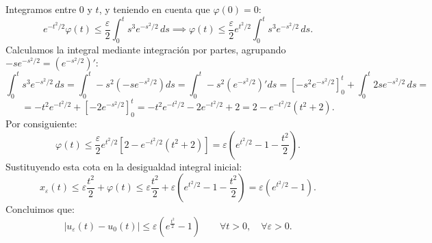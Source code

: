 {\[    \]
    Integramos entre $0$ y $t$, y teniendo en cuenta que $\varphi(0) = 0$:
    \[
        e^{-t^2/2} \varphi(t) \le \frac{\varepsilon}{2} \int_0^t s^3 e^{-s^2/2} \, ds \implies \varphi(t) \le \frac{\varepsilon}{2} e^{t^2/2} \int_0^t s^3 e^{-s^2/2} \, ds.
    \]
    Calculamos la integral mediante integración por partes, agrupando $-s e^{-s^2/2} = (e^{-s^2/2})'$:
    \[
        \int_0^t s^3 e^{-s^2/2} \, ds = \int_0^t -s^2 \left( -s e^{-s^2/2} \right) ds = \int_0^t -s^2 \left( e^{-s^2/2} \right)' ds = \left[ -s^2 e^{-s^2/2} \right]_0^t + \int_0^t 2s e^{-s^2/2} \, ds =
    \]
    \[
        = -t^2 e^{-t^2/2} + \left[ -2 e^{-s^2/2} \right]_0^t = -t^2 e^{-t^2/2} - 2 e^{-t^2/2} + 2 = 2 - e^{-t^2/2}(t^2 + 2).
    \]
    Por consiguiente:
    \[
        \varphi(t) \le \frac{\varepsilon}{2} e^{t^2/2} \left[ 2 - e^{-t^2/2}(t^2 + 2) \right] = \varepsilon \left( e^{t^2/2} - 1 - \frac{t^2}{2} \right).
    \]
    Sustituyendo esta cota en la desigualdad integral inicial:
    \[
        x_\varepsilon(t) \le \varepsilon \frac{t^2}{2} + \varphi(t) \le \varepsilon \frac{t^2}{2} + \varepsilon \left( e^{t^2/2} - 1 - \frac{t^2}{2} \right) = \varepsilon \left( e^{t^2/2} - 1 \right).
    \]
    Concluimos que:
    \[
        |u_\varepsilon(t) - u_0(t)| \le \varepsilon \left( e^{\frac{t^2}{2}} - 1 \right) \qquad \forall t > 0, \quad \forall \varepsilon > 0.
    \]
}

